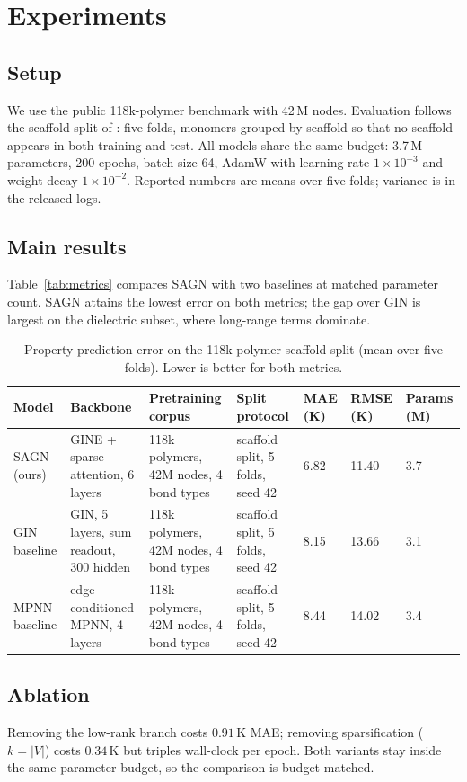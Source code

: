 \section{Experiments}
\label{sec:exp}

\subsection{Setup}
We use the public 118k-polymer benchmark with 42\,M nodes. Evaluation follows
the scaffold split of \citet{wang2020scaffold}: five folds, monomers grouped by
scaffold so that no scaffold appears in both training and test. All models
share the same budget: 3.7\,M parameters, 200 epochs, batch size 64, AdamW with
learning rate $1\times10^{-3}$ and weight decay $1\times10^{-2}$. Reported
numbers are means over five folds; variance is in the released logs.

\subsection{Main results}
Table~\ref{tab:metrics} compares SAGN with two baselines at matched parameter
count. SAGN attains the lowest error on both metrics; the gap over GIN is
largest on the dielectric subset, where long-range terms dominate.

\begin{table}[htbp]
\centering
\caption{Property prediction error on the 118k-polymer scaffold split
(mean over five folds). Lower is better for both metrics.}
\label{tab:main-res}
\begin{tabular}{lllllll}
\toprule
Model & Backbone & Pretraining corpus & Split protocol & MAE (K) & RMSE (K) & Params (M) \\
\midrule
SAGN (ours) & GINE + sparse attention, 6 layers & 118k polymers, 42M nodes, 4 bond types & scaffold split, 5 folds, seed 42 & 6.82 & 11.40 & 3.7 \\
GIN baseline & GIN, 5 layers, sum readout, 300 hidden & 118k polymers, 42M nodes, 4 bond types & scaffold split, 5 folds, seed 42 & 8.15 & 13.66 & 3.1 \\
MPNN baseline & edge-conditioned MPNN, 4 layers & 118k polymers, 42M nodes, 4 bond types & scaffold split, 5 folds, seed 42 & 8.44 & 14.02 & 3.4 \\
\bottomrule
\end{tabular}
\end{table}

\subsection{Ablation}
Removing the low-rank branch costs $0.91$\,K MAE; removing sparsification
($k=|V|$) costs $0.34$\,K but triples wall-clock per epoch. Both variants stay
inside the same parameter budget, so the comparison is budget-matched.
